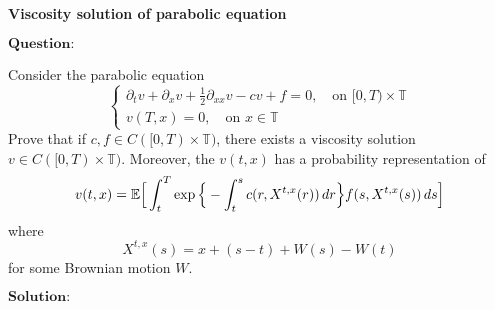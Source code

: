 \documentclass[12pt,a4paper]{ctexart}
\begin{document}
\begin{center}
\textbf{Viscosity solution of parabolic equation}
\vspace{8pt}

\end{center}

\vspace{12pt}

$\textbf{Question:}$

Consider the parabolic equation
\begin{equation} \label{parabolic equation}
    \begin{cases}
   \partial_{t} v + \partial_{x} v + \frac{1}{2} \partial_{xx} v - c v + f = 0, \quad \text{on} \,\, [0,T) \times \mathbb{T} \\
   v(T, x) = 0, \quad \text{on} \,\,  x \in \mathbb{T}
   \end{cases}
\end{equation}
Prove that if $c, f \in C([0, T) \times \mathbb{T})$, there exists a viscosity solution $v \in C([0, T) \times \mathbb{T})$. Moreover, the $v(t, x)$ has a probability representation of
\begin{equation} \label{value function}
    v(t,x) = \mathbb{E} \Big{[} \int_{t}^{T} \exp{\Big{\{}- \int_{t}^{s} c(r, X^{t, x}(r)) \, d r \Big{\}}} f(s, X^{t, x}(s)) \, d s \Big{]}
\end{equation}
where
\begin{equation} \label{process}
    X^{t,x}(s) = x + (s - t) + W(s) - W(t) 
\end{equation}
for some Brownian motion $W$.

\vspace{8pt}

$\textbf{Solution:}$
\end{document}
